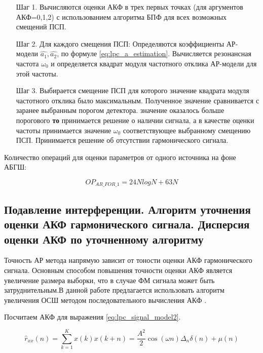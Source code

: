 \begin{itemize}
\item[Шаг 1.] Вычисляются оценки  АКФ в трех первых точках (для аргументов АКФ=0,1,2)
	с использованием алгоритма БПФ для всех возможных смещений ПСП. 
\item[Шаг 2.] Для каждого смещения ПСП: 
	Определяются коэффициенты АР-модели ${\hat{a_1}, \hat{a_2}}$, 
	по формуле \ref{eq:lpc_a_estimation}. 
	Вычисляется резонансная частота ${\omega_0}$
	и определяется квадрат модуля частотного отклика АР-модели для этой частоты. 
\item[Шаг 3.] Выбирается смещение ПСП для которого значение квадрата модуля частотного отклика было максимальным. Полученное значение сравнивается с заранее выбранным порогом детектора. 
	  значение оказалось больше порогового {\bf{то}} 
		принимается решение о наличии сигнала, а в качестве оценки
		частоты принимается значение ${\omega_0}$ соответствующее выбранному смещению ПСП. 
		Принимается решение об отсутствии гармонического сигнала.
\end{itemize}

Количество операций для оценки параметров от одного источника на фоне АБГШ:
\begin{center}
\begin{equation}
	OP_{AR\_FOR\_1} = 24NlogN + 63N
\end{equation}
\end{center}

\subsection{Подавление интерференции. Алгоритм уточнения оценки АКФ гармонического сигнала.
		Дисперсия оценки АКФ по уточненному алгоритму}
\label{ssec4:quadruple}

Точность АР метода напрямую зависит от тоности оценки АКФ гармонического сигнала. Основным способом повышения точности оценки АКФ является увеличение размера выборки,
что в случае ФМ сигнала может быть затруднительным.В данной работе предлагается использовать алгоритм увеличения ОСШ методом последовательного вычисления
АКФ \cite{ostanin_akf}.

Посчитаем АКФ для выражения \ref{eq:lpc_signal_model2}.

\begin{center}
\begin{equation}
	\label{eq:lpc_akf_n}
	\hat{r}_{xx}(n) = \sum \limits_{k=1}^{K} x(k)x(k+n) = \frac{A^2}{2} \cos{(\omega{n})} \Delta_n \delta{(n)} + \mu{(n)}
\end{equation}
\end{center}

